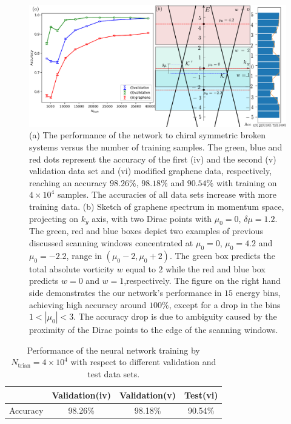 \documentclass{article}
\begin{document}
\begin{figure}[H]
    \centering
    \includegraphics[width=1\textwidth]{Accuracy_density_spectrum_broken_v2.pdf}
    \caption{(a) The performance of the network to chiral symmetric broken systems versus the number of training samples. The green, blue and red dots represent the accuracy of the first (iv) and the second (v) validation data set and (vi) modified graphene data, respectively, reaching an accuracy $ 98.26 \% $, $ 98.18 \% $ and $ 90.54 \% $ with training on $ 4 \times 10^4 $ samples. The accuracies of all data sets increase with more training data. (b) Sketch of graphene spectrum in momentum space, projecting on $ k_y $ axis, with two Dirac points with $ \mu_0=0 $, $ \delta \mu = 1.2 $. The green, red and blue boxes depict two examples of previous discussed scanning windows concentrated at $ \mu_0=0 $, $ \mu_{0} = 4.2  $ and $ \mu_0 = -2.2 $, range in $ \left(\mu_0 -2,\mu_0 +2\right) $. The green box predicts the total absolute vorticity $ w $ equal to $ 2 $ while the red and blue box predicts $ w=0 $ and $ w=1 $,respectively. The figure on the right hand side demonstrates the our network's performance in $ 15 $ energy bins, achieving high accuracy around $ 100 \% $, except for a drop in the bins $ 1<|\mu_0|<3$. The accuracy drop is due to ambiguity caused by the proximity of the Dirac points to the edge of the scanning windows.}
    \label{fig:Acc_density_spectrum_broken}
\end{figure}

\begin{table}[H]
    \centering
    \begin{tabular}{c|c|c|c}
        \toprule
             & Validation(iv)  & Validation(v) & Test(vi)   \\
        \midrule
        Accuracy     & 98.26\% & 98.18\% &  90.54\%  \\
        \bottomrule
    \end{tabular}
    \caption{Performance of the neural network training by $ N_{\textrm{trian}} = 4 \times 10^4  $ with respect to different validation and test data sets.}
    \label{tab:Performance}
\end{table}

\end{document}
